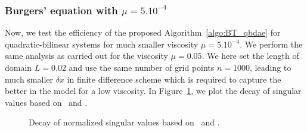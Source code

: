 \subsubsection{Burgers' equation with $\mu = 5.10^{-4}$}
Now, we test the efficiency of the proposed Algorithm~\ref{algo:BT_qbdae} for quadratic-bilinear systems for much smaller viscosity $\mu = 5.10^{-4}$. We perform the same analysis as carried out for the viscosity $\mu = 0.05$. We here set the length of domain $L = 0.02$ and use the same number of grid points $n = 1000$,  leading to much smaller $\delta x$ in finite difference scheme which is required to capture the  better in the model for a low viscosity. In Figure~\ref{fig:SV_Burger_low}, we plot the decay of singular values based on \GramQB ~and \GramB.
\begin{figure}[h]
\centering
	\setlength\fheight{3cm}
	\setlength\fwidth{6cm}
	
	\caption{Decay of normalized singular values based on \GramQB~and \GramB.}
	\label{fig:SV_Burger_low}
\end{figure}

